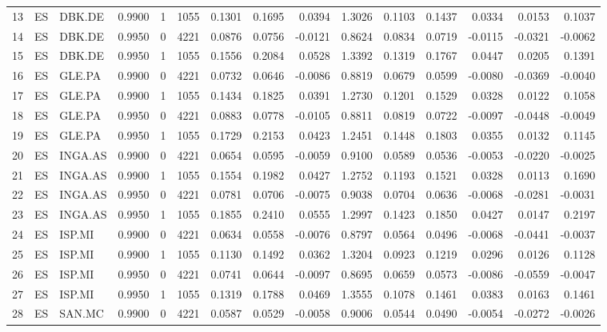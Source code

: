 \begin{table}
\begin{tabular}{lllrrrrrrrrrrrr}
13 & ES & DBK.DE & 0.9900 & 1 & 1055 & 0.1301 & 0.1695 & 0.0394 & 1.3026 & 0.1103 & 0.1437 & 0.0334 & 0.0153 & 0.1037 \\
14 & ES & DBK.DE & 0.9950 & 0 & 4221 & 0.0876 & 0.0756 & -0.0121 & 0.8624 & 0.0834 & 0.0719 & -0.0115 & -0.0321 & -0.0062 \\
15 & ES & DBK.DE & 0.9950 & 1 & 1055 & 0.1556 & 0.2084 & 0.0528 & 1.3392 & 0.1319 & 0.1767 & 0.0447 & 0.0205 & 0.1391 \\
16 & ES & GLE.PA & 0.9900 & 0 & 4221 & 0.0732 & 0.0646 & -0.0086 & 0.8819 & 0.0679 & 0.0599 & -0.0080 & -0.0369 & -0.0040 \\
17 & ES & GLE.PA & 0.9900 & 1 & 1055 & 0.1434 & 0.1825 & 0.0391 & 1.2730 & 0.1201 & 0.1529 & 0.0328 & 0.0122 & 0.1058 \\
18 & ES & GLE.PA & 0.9950 & 0 & 4221 & 0.0883 & 0.0778 & -0.0105 & 0.8811 & 0.0819 & 0.0722 & -0.0097 & -0.0448 & -0.0049 \\
19 & ES & GLE.PA & 0.9950 & 1 & 1055 & 0.1729 & 0.2153 & 0.0423 & 1.2451 & 0.1448 & 0.1803 & 0.0355 & 0.0132 & 0.1145 \\
20 & ES & INGA.AS & 0.9900 & 0 & 4221 & 0.0654 & 0.0595 & -0.0059 & 0.9100 & 0.0589 & 0.0536 & -0.0053 & -0.0220 & -0.0025 \\
21 & ES & INGA.AS & 0.9900 & 1 & 1055 & 0.1554 & 0.1982 & 0.0427 & 1.2752 & 0.1193 & 0.1521 & 0.0328 & 0.0113 & 0.1690 \\
22 & ES & INGA.AS & 0.9950 & 0 & 4221 & 0.0781 & 0.0706 & -0.0075 & 0.9038 & 0.0704 & 0.0636 & -0.0068 & -0.0281 & -0.0031 \\
23 & ES & INGA.AS & 0.9950 & 1 & 1055 & 0.1855 & 0.2410 & 0.0555 & 1.2997 & 0.1423 & 0.1850 & 0.0427 & 0.0147 & 0.2197 \\
24 & ES & ISP.MI & 0.9900 & 0 & 4221 & 0.0634 & 0.0558 & -0.0076 & 0.8797 & 0.0564 & 0.0496 & -0.0068 & -0.0441 & -0.0037 \\
25 & ES & ISP.MI & 0.9900 & 1 & 1055 & 0.1130 & 0.1492 & 0.0362 & 1.3204 & 0.0923 & 0.1219 & 0.0296 & 0.0126 & 0.1128 \\
26 & ES & ISP.MI & 0.9950 & 0 & 4221 & 0.0741 & 0.0644 & -0.0097 & 0.8695 & 0.0659 & 0.0573 & -0.0086 & -0.0559 & -0.0047 \\
27 & ES & ISP.MI & 0.9950 & 1 & 1055 & 0.1319 & 0.1788 & 0.0469 & 1.3555 & 0.1078 & 0.1461 & 0.0383 & 0.0163 & 0.1461 \\
28 & ES & SAN.MC & 0.9900 & 0 & 4221 & 0.0587 & 0.0529 & -0.0058 & 0.9006 & 0.0544 & 0.0490 & -0.0054 & -0.0272 & -0.0026 \\

\end{tabular}
\end{table}
